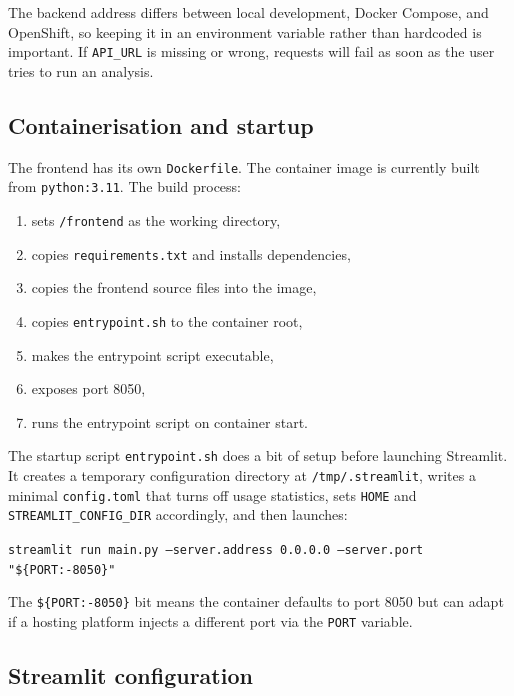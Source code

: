 \documentclass{article}
\begin{document}
The backend address differs between local development, Docker Compose, and OpenShift, so keeping it in an environment variable rather than hardcoded is important. If \texttt{API\_URL} is missing or wrong, requests will fail as soon as the user tries to run an analysis.

\subsection{Containerisation and startup}

The frontend has its own \texttt{Dockerfile}. The container image is currently built from \texttt{python:3.11}. The build process:

\begin{enumerate}
    \item sets \texttt{/frontend} as the working directory,
    \item copies \texttt{requirements.txt} and installs dependencies,
    \item copies the frontend source files into the image,
    \item copies \texttt{entrypoint.sh} to the container root,
    \item makes the entrypoint script executable,
    \item exposes port 8050,
    \item runs the entrypoint script on container start.
\end{enumerate}

The startup script \texttt{entrypoint.sh} does a bit of setup before launching Streamlit. It creates a temporary configuration directory at \texttt{/tmp/.streamlit}, writes a minimal \texttt{config.toml} that turns off usage statistics, sets \texttt{HOME} and \texttt{STREAMLIT\_CONFIG\_DIR} accordingly, and then launches:

\begin{center}
\texttt{streamlit run main.py --server.address 0.0.0.0 --server.port "\$\{PORT:-8050\}"}
\end{center}

The \texttt{\$\{PORT:-8050\}} bit means the container defaults to port 8050 but can adapt if a hosting platform injects a different port via the \texttt{PORT} variable.

\subsection{Streamlit configuration}
\end{document}
